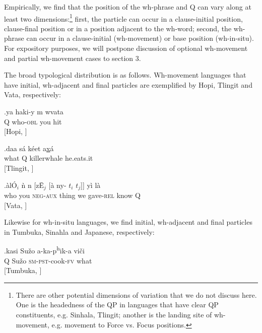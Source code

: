 \documentclass{glossa}
\begin{document}
Empirically, we find that the position of the wh-phrase and Q can vary along at least two dimensions:\footnote{There are other potential dimensions of variation that we do not discuss here. One is the headedness of the QP in languages that have clear QP constituents, e.g. Sinhala, Tlingit; another is the landing site of wh-movement, e.g. movement to Force vs. Focus positions.} first, the particle can occur in a clause-initial position, clause-final position or in a position adjacent to the wh-word; second, the wh-phrase can occur in a clause-initial (wh-movement) or base position (wh-in-situ). For expository purposes, we will postpone discussion of optional wh-movement and partial wh-movement cases to section 3.

The broad typological distribution is as follows. Wh-movement languages that have initial, wh-adjacent and final particles are exemplified by Hopi, Tlingit and Vata, respectively:


\exg.\label{wh.50}ya haki-y {\textraiseglotstop\textbari}m w{\textbari}va{\textraiseglotstop}ta \\
  Q who-\textsc{obl} you hit \\
  \hspace{\fill}[Hopi, \cite{jeanne:1978}]

\exg.\label{wh.60}daa s\'a k\'eet a\underline{x}\'a \\
  what Q killerwhale he.eats.it \\
  \hspace{\fill}[Tlingit, \cite{cable:2007}]

\exg.\label{wh.70}\`al\'O$_i$ \`n n{} [z\={E}$_j$ [\`a ny{}-{} $t_i$ $t_j$]] y\`i l\`a\\
  who you \textsc{neg-aux} thing we gave-\textsc{rel} {} {} know Q \\
  \hspace{\fill}[Vata, \cite{koopman:1984}]

Likewise for wh-in-situ languages, we find initial, wh-adjacent and final particles in Tumbuka, Sinahla and Japanese, respectively:

\exg.\label{wh.80}kasi Su\v{z}o a-ka-p\textsuperscript{h}ik-a vi\v{c}i \\
  Q Su\v{z}o \textsc{sm-pst}-cook-\textsc{fv} what \\
  \hspace{\fill}[Tumbuka, \cite{kimper:2006}]
\end{document}
